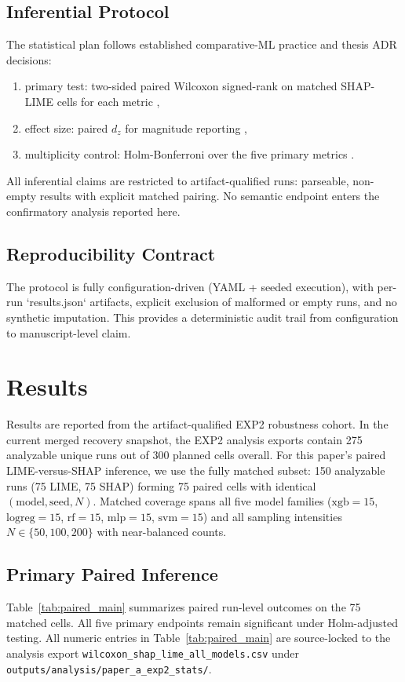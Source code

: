 \documentclass[twoside,11pt]{article}
\begin{document}
\subsection{Inferential Protocol}
The statistical plan follows established comparative-ML practice
\citep{demsar2006statistical} and thesis ADR decisions:
\begin{enumerate}[leftmargin=*]
\item primary test: two-sided paired Wilcoxon signed-rank on matched
SHAP-LIME cells for each metric \citep{wilcoxon1945individual},
\item effect size: paired \(d_z\) for magnitude reporting
\citep{lakens2013calculating},
\item multiplicity control: Holm-Bonferroni over the five primary
metrics \citep{holm1979simple}.
\end{enumerate}

All inferential claims are restricted to artifact-qualified runs:
parseable, non-empty results with explicit matched pairing. No semantic
endpoint enters the confirmatory analysis reported here.

\subsection{Reproducibility Contract}
The protocol is fully configuration-driven (YAML + seeded execution),
with per-run `results.json` artifacts, explicit exclusion of malformed or
empty runs, and no synthetic imputation. This provides a deterministic
audit trail from configuration to manuscript-level claim.

\section{Results}
Results are reported from the artifact-qualified EXP2 robustness cohort.
In the current merged recovery snapshot, the EXP2 analysis exports
contain 275 analyzable unique runs out of 300 planned cells overall.
For this paper's paired LIME-versus-SHAP inference, we use the fully
matched subset: 150 analyzable runs (75 LIME, 75 SHAP) forming 75
paired cells with identical \((\mathrm{model}, \mathrm{seed}, N)\).
Matched coverage spans all five model families
(\(\mathrm{xgb}=15\), \(\mathrm{logreg}=15\), \(\mathrm{rf}=15\),
\(\mathrm{mlp}=15\), \(\mathrm{svm}=15\)) and all sampling intensities
\(N\in\{50,100,200\}\) with near-balanced counts.

\subsection{Primary Paired Inference}
Table~\ref{tab:paired_main} summarizes paired run-level outcomes on the
75 matched cells. All five primary endpoints remain significant under
Holm-adjusted testing.
All numeric entries in Table~\ref{tab:paired_main} are source-locked to
the analysis export \texttt{wilcoxon\_shap\_lime\_all\_models.csv} under
\texttt{outputs/analysis/paper\_a\_exp2\_stats/}.
\end{document}
